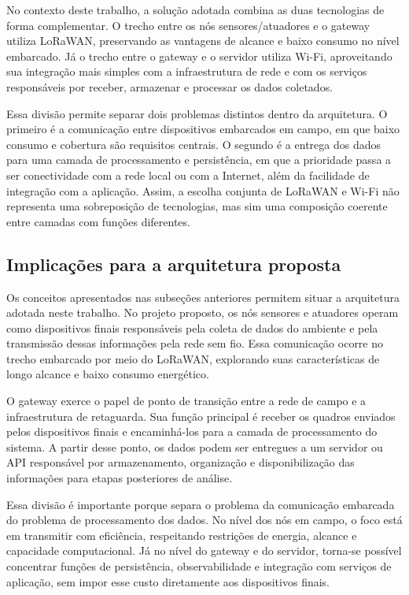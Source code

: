 No contexto deste trabalho, a solução adotada combina as duas tecnologias de forma complementar. O trecho entre os nós sensores/atuadores e o gateway utiliza LoRaWAN, preservando as vantagens de alcance e baixo consumo no nível embarcado. Já o trecho entre o gateway e o servidor utiliza Wi-Fi, aproveitando sua integração mais simples com a infraestrutura de rede e com os serviços responsáveis por receber, armazenar e processar os dados coletados.

Essa divisão permite separar dois problemas distintos dentro da arquitetura. O primeiro é a comunicação entre dispositivos embarcados em campo, em que baixo consumo e cobertura são requisitos centrais. O segundo é a entrega dos dados para uma camada de processamento e persistência, em que a prioridade passa a ser conectividade com a rede local ou com a Internet, além da facilidade de integração com a aplicação. Assim, a escolha conjunta de LoRaWAN e Wi-Fi não representa uma sobreposição de tecnologias, mas sim uma composição coerente entre camadas com funções diferentes.


\subsection{Implicações para a arquitetura proposta}

Os conceitos apresentados nas subseções anteriores permitem situar a arquitetura adotada neste trabalho. No projeto proposto, os nós sensores e atuadores operam como dispositivos finais responsáveis pela coleta de dados do ambiente e pela transmissão dessas informações pela rede sem fio. Essa comunicação ocorre no trecho embarcado por meio do LoRaWAN, explorando suas características de longo alcance e baixo consumo energético.

O gateway exerce o papel de ponto de transição entre a rede de campo e a infraestrutura de retaguarda. Sua função principal é receber os quadros enviados pelos dispositivos finais e encaminhá-los para a camada de processamento do sistema. A partir desse ponto, os dados podem ser entregues a um servidor ou API responsável por armazenamento, organização e disponibilização das informações para etapas posteriores de análise.

Essa divisão é importante porque separa o problema da comunicação embarcada do problema de processamento dos dados. No nível dos nós em campo, o foco está em transmitir com eficiência, respeitando restrições de energia, alcance e capacidade computacional. Já no nível do gateway e do servidor, torna-se possível concentrar funções de persistência, observabilidade e integração com serviços de aplicação, sem impor esse custo diretamente aos dispositivos finais.

